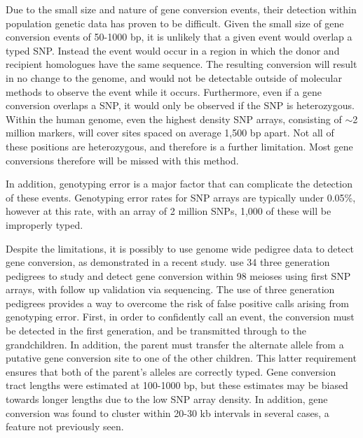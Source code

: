 




Due to the small size and nature of gene conversion events, their detection within population genetic data has proven to be difficult.
Given the small size of gene conversion events of 50-1000 bp, it is unlikely that a given event would overlap a typed SNP.
Instead the event would occur in a region in which the donor and recipient homologues have the same sequence.
The resulting conversion will result in no change to the genome, and would not be detectable outside of molecular methods to observe the event while it occurs.
Furthermore, even if a gene conversion overlaps a SNP, it would only be observed if the SNP is heterozygous.
Within the human genome, even the highest density SNP arrays, consisting of $\sim$2 million markers, will cover sites spaced on average 1,500 bp apart.
Not all of these positions are heterozygous, and therefore is a further limitation.
Most gene conversions therefore will be missed with this method.

In addition, genotyping error is a major factor that can complicate the detection of these events.
Genotyping error rates for SNP arrays are typically under 0.05\%\cite{Imai2010}, however at this rate, with an array of 2 million SNPs, 1,000 of these will be improperly typed.

Despite the limitations, it is possibly to use genome wide pedigree data to detect gene conversion, as demonstrated in a recent study.
\citet{Williams2015} use 34 three generation pedigrees to study and detect gene conversion within 98 meioses using first SNP arrays, with follow up validation via sequencing.
The use of three generation pedigrees provides a way to overcome the risk of false positive calls arising from genotyping error.
First, in order to confidently call an event, the conversion must be detected in the first generation, and be transmitted through to the grandchildren.
In addition, the parent must transfer the alternate allele from a putative gene conversion site to one of the other children.
This latter requirement ensures that both of the parent's alleles are correctly typed.
Gene conversion tract lengths were estimated at 100-1000 bp, but these estimates may be biased towards longer lengths due to the low SNP array density.
In addition, gene conversion was found to cluster within 20-30 kb intervals in several cases, a feature not previously seen.


